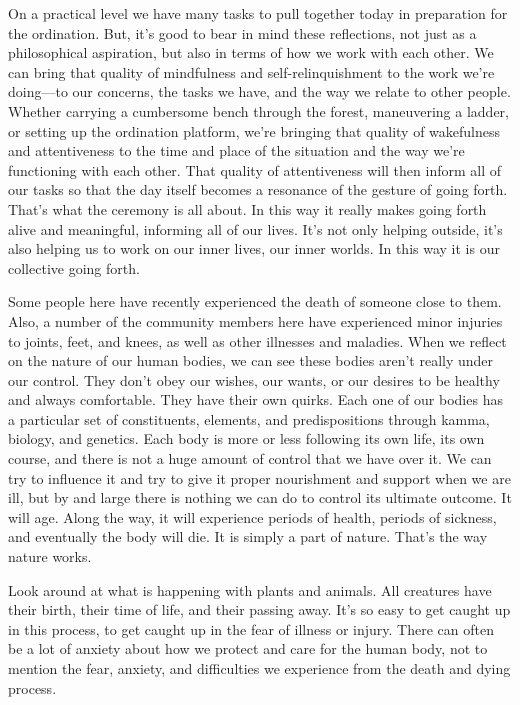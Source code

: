 On a practical level we have many tasks to pull together today in 
preparation for the ordination. But, it's good to bear in mind these 
reflections, not just as a philosophical aspiration, but also in terms 
of how we work with each other. We can bring that quality of 
mindfulness and self-relinquishment to the work we're doing---to our 
concerns, the tasks we have, and the way we relate to other people. 
Whether carrying a cumbersome bench through the forest, maneuvering a 
ladder, or setting up the ordination platform, we're bringing that 
quality of wakefulness and attentiveness to the time and place of the 
situation and the way we're functioning with each other. That quality 
of attentiveness will then inform all of our tasks so that the day 
itself becomes a resonance of the gesture of going forth. That's what 
the ceremony is all about. In this way it really makes going forth 
alive and meaningful, informing all of our lives. It's not only helping 
outside, it's also helping us to work on our inner lives, our inner 
worlds. In this way it is our collective going forth.


Some people here have recently experienced the death of someone close 
to them. Also, a number of the community members here have experienced 
minor injuries to joints, feet, and knees, as well as other illnesses 
and maladies. When we reflect on the nature of our human bodies, we can 
see these bodies aren't really under our control. They don't obey our 
wishes, our wants, or our desires to be healthy and always comfortable. 
They have their own quirks. Each one of our bodies has a particular set 
of constituents, elements, and predispositions through kamma, biology, 
and genetics. Each body is more or less following its own life, its own 
course, and there is not a huge amount of control that we have over it. 
We can try to influence it and try to give it proper nourishment and 
support when we are ill, but by and large there is nothing we can do to 
control its ultimate outcome. It will age. Along the way, it will 
experience periods of health, periods of sickness, and eventually the 
body will die. It is simply a part of nature. That's the way nature 
works.

Look around at what is happening with plants and animals. All creatures 
have their birth, their time of life, and their passing away. It's so 
easy to get caught up in this process, to get caught up in the fear of 
illness or injury. There can often be a lot of anxiety about how we 
protect and care for the human body, not to mention the fear, anxiety, 
and difficulties we experience from the death and dying process.

